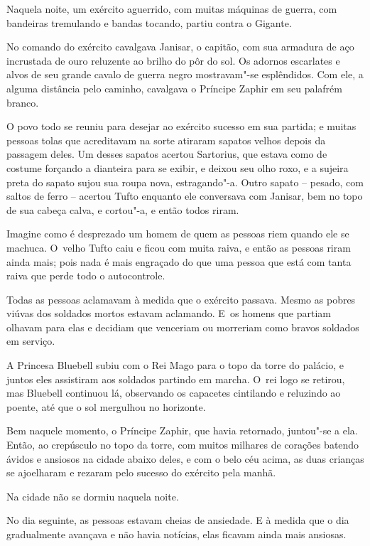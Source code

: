 Naquela noite, um exército aguerrido, com muitas máquinas de guerra, com
bandeiras tremulando e bandas tocando, partiu contra o Gigante.

No comando do exército cavalgava Janisar, o capitão, com sua armadura de
aço incrustada de ouro reluzente ao brilho do pôr do sol. Os adornos
escarlates e alvos de seu grande cavalo de guerra negro mostravam"-se
esplêndidos. Com ele, a alguma distância pelo caminho, cavalgava o
Príncipe Zaphir em seu palafrém branco.

O povo todo se reuniu para desejar ao exército sucesso em sua partida; e
muitas pessoas tolas que acreditavam na sorte atiraram sapatos velhos
depois da passagem deles. Um desses sapatos acertou Sartorius, que
estava como de costume forçando a dianteira para se exibir, e deixou seu
olho roxo, e a sujeira preta do sapato sujou sua roupa nova,
estragando"-a. Outro sapato -- pesado, com saltos de ferro -- acertou
Tufto enquanto ele conversava com Janisar, bem no topo de sua cabeça
calva, e cortou"-a, e então todos riram.

Imagine como é desprezado um homem de quem as pessoas riem quando ele se
machuca. O~velho Tufto caiu e ficou com muita raiva, e então as pessoas
riram ainda mais; pois nada é mais engraçado do que uma pessoa que está
com tanta raiva que perde todo o autocontrole.

Todas as pessoas aclamavam à medida que o exército passava. Mesmo as
pobres viúvas dos soldados mortos estavam aclamando. E~os homens que
partiam olhavam para elas e decidiam que venceriam ou morreriam como
bravos soldados em serviço.

A Princesa Bluebell subiu com o Rei Mago para o topo da torre do palácio,
e juntos eles assistiram aos soldados partindo em marcha. O~rei logo se
retirou, mas Bluebell continuou lá, observando os capacetes cintilando e
reluzindo ao poente, até que o sol mergulhou no horizonte.

Bem naquele momento, o Príncipe Zaphir, que havia retornado, juntou"-se a
ela. Então, ao crepúsculo no topo da torre, com muitos milhares de
corações batendo ávidos e ansiosos na cidade abaixo deles, e com o belo
céu acima, as duas crianças se ajoelharam e rezaram pelo sucesso do
exército pela manhã.

\smallskip
Na cidade não se dormiu naquela noite.

\smallskip
No dia seguinte, as pessoas estavam cheias de ansiedade. E à medida que
o dia gradualmente avançava e não havia notícias, elas ficavam ainda
mais ansiosas.

